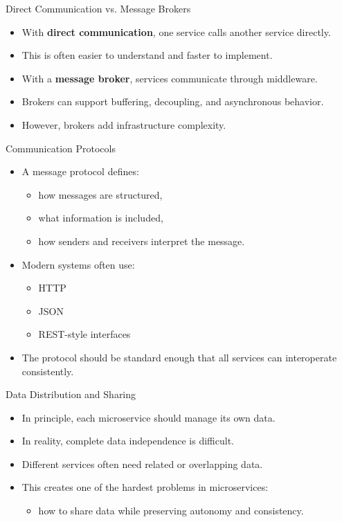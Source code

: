 \begin{frame}{Direct Communication vs. Message Brokers}
\begin{itemize}
    \item With \textbf{direct communication}, one service calls another service directly.
    \item This is often easier to understand and faster to implement.
    \item With a \textbf{message broker}, services communicate through middleware.
    \item Brokers can support buffering, decoupling, and asynchronous behavior.
    \item However, brokers add infrastructure complexity.
\end{itemize}
\end{frame}

\begin{frame}{Communication Protocols}
\begin{itemize}
    \item A message protocol defines:
    \begin{itemize}
        \item how messages are structured,
        \item what information is included,
        \item how senders and receivers interpret the message.
    \end{itemize}
    \item Modern systems often use:
    \begin{itemize}
        \item HTTP
        \item JSON
        \item REST-style interfaces
    \end{itemize}
    \item The protocol should be standard enough that all services can interoperate consistently.
\end{itemize}
\end{frame}

\begin{frame}{Data Distribution and Sharing}
\begin{itemize}
    \item In principle, each microservice should manage its own data.
    \item In reality, complete data independence is difficult.
    \item Different services often need related or overlapping data.
    \item This creates one of the hardest problems in microservices:
    \begin{itemize}
        \item how to share data while preserving autonomy and consistency.
    \end{itemize}
\end{itemize}
\end{frame}

